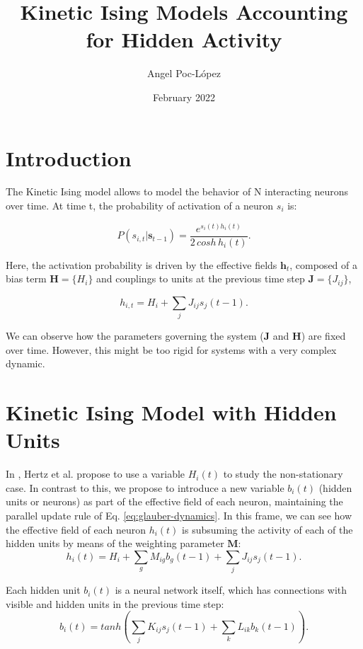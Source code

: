 \documentclass{article}
\title{Kinetic Ising Models Accounting for Hidden Activity}
\author{Angel Poc-López}
\date{February 2022}
\def\*#1{\mathbf{#1}}
\begin{document}
\maketitle

\section{Introduction}

The Kinetic Ising model allows to model the behavior of N interacting neurons over time. At time t, the probability of activation of a neuron $s_i$ is:

\begin{equation}
    P(s_{i,t} | \*s_{t-1}) = \frac{e^{s_{i}(t) h_{i}(t) }}{2 \, cosh \, h_{i}(t)}.
    \label{eq:glauber-dynamics}
\end{equation}

Here, the activation probability is driven by the effective fields $\*h_{t}$, composed of a bias term $\*H = \{H_i\}$ and couplings to units at the previous time step $\*J= \{J_{ij}\}$,

\begin{equation}
\label{eq:h1}
    h_{i,t} = H_{i} + \sum_j J_{ij}s_{j}(t-1).
\end{equation}

We can observe how the parameters governing the system ($\*J$ and $\*H$) are fixed over time. However, this might be too rigid for systems with a very complex dynamic.


\section{Kinetic Ising Model with Hidden Units}

In \cite{hertz2011ising}, Hertz et al. propose to use a variable $H_i(t)$ to study the non-stationary case. In contrast to this, we propose to introduce a new variable $b_i(t)$ (hidden units or neurons) as part of the effective field of each neuron, maintaining the parallel update rule of Eq. \ref{eq:glauber-dynamics}. In this frame, we can see how the effective field of each neuron $h_i(t)$ is subsuming the activity of each of the hidden units by means of the weighting parameter $\*M$:
\begin{equation}
\label{eq:h2}
    h_{i}(t) = H_i + \sum_g M_{ig}b_g(t-1) + \sum_j J_{ij}s_{j}(t-1).
\end{equation}


Each hidden unit $b_i(t)$ is a neural network itself, which has connections with visible and hidden units in the previous time step:
\begin{equation}
    b_i(t) = tanh {\left ( \sum_j K_{ij} s_j(t-1) + \sum_k L_{ik} b_k(t-1) \right )}.
\end{equation}
\end{document}
